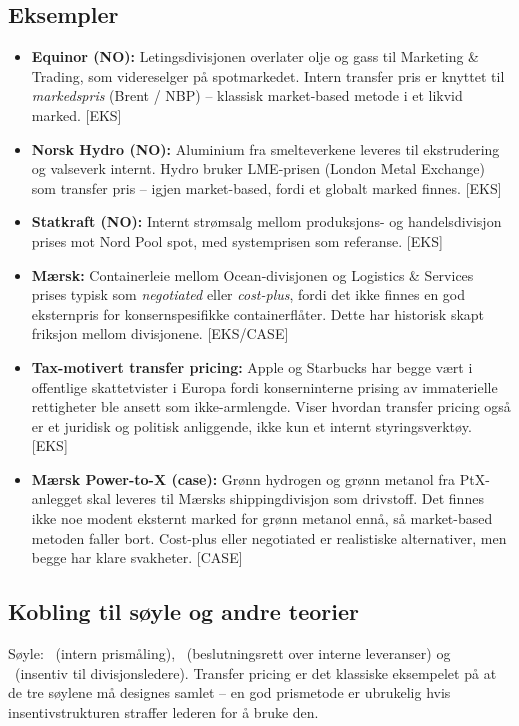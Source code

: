 \subsection*{Eksempler}
\begin{itemize}
\item \textbf{Equinor (NO):} Letingsdivisjonen overlater olje og gass til Marketing \& Trading, som videreselger på spotmarkedet. Intern transfer pris er knyttet til \emph{markedspris} (Brent / NBP) -- klassisk market-based metode i et likvid marked. [EKS]
\item \textbf{Norsk Hydro (NO):} Aluminium fra smelteverkene leveres til ekstrudering og valseverk internt. Hydro bruker LME-prisen (London Metal Exchange) som transfer pris -- igjen market-based, fordi et globalt marked finnes. [EKS]
\item \textbf{Statkraft (NO):} Internt strømsalg mellom produksjons- og handelsdivisjon prises mot Nord Pool spot, med systemprisen som referanse. [EKS]
\item \textbf{Mærsk:} Containerleie mellom Ocean-divisjonen og Logistics \& Services prises typisk som \emph{negotiated} eller \emph{cost-plus}, fordi det ikke finnes en god eksternpris for konsernspesifikke containerflåter. Dette har historisk skapt friksjon mellom divisjonene. [EKS/CASE]
\item \textbf{Tax-motivert transfer pricing:} Apple og Starbucks har begge vært i offentlige skattetvister i Europa fordi konserninterne prising av immaterielle rettigheter ble ansett som ikke-armlengde. Viser hvordan transfer pricing også er et juridisk og politisk anliggende, ikke kun et internt styringsverktøy. [EKS]
\item \textbf{Mærsk Power-to-X (case):} Grønn hydrogen og grønn metanol fra PtX-anlegget skal leveres til Mærsks shippingdivisjon som drivstoff. Det finnes ikke noe modent eksternt marked for grønn metanol enn\aa, så market-based metoden faller bort. Cost-plus eller negotiated er realistiske alternativer, men begge har klare svakheter. [CASE]
\end{itemize}

\subsection*{Kobling til søyle og andre teorier}
Søyle: \STwo\ (intern prismåling), \SOne\ (beslutningsrett over interne leveranser) og \SThree\ (insentiv til divisjonsledere). Transfer pricing er det klassiske eksempelet på at de tre søylene må designes samlet -- en god prismetode er ubrukelig hvis insentivstrukturen straffer lederen for å bruke den.

